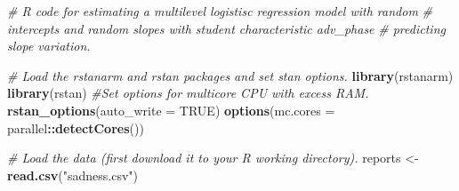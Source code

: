 \documentclass[
  english,
  doc]{apa6}
\newenvironment{Shaded}{\begin{snugshade}}{\end{snugshade}}
\newcommand{\CommentTok}[1]{\textcolor[rgb]{0.56,0.35,0.01}{\textit{#1}}}
\newcommand{\DataTypeTok}[1]{\textcolor[rgb]{0.13,0.29,0.53}{#1}}
\newcommand{\KeywordTok}[1]{\textcolor[rgb]{0.13,0.29,0.53}{\textbf{#1}}}
\newcommand{\NormalTok}[1]{#1}
\newcommand{\OperatorTok}[1]{\textcolor[rgb]{0.81,0.36,0.00}{\textbf{#1}}}
\newcommand{\OtherTok}[1]{\textcolor[rgb]{0.56,0.35,0.01}{#1}}
\newcommand{\StringTok}[1]{\textcolor[rgb]{0.31,0.60,0.02}{#1}}
\begin{document}
\begin{Shaded}
\begin{Highlighting}[]
\CommentTok{\# R code for estimating a multilevel logistisc regression model with random}
\CommentTok{\# intercepts and random slopes with student characteristic \textquotesingle{}adv\_phase\textquotesingle{}}
\CommentTok{\# predicting slope variation.}

\CommentTok{\# Load the rstanarm and rstan packages and set stan options.}
\KeywordTok{library}\NormalTok{(rstanarm)}
\KeywordTok{library}\NormalTok{(rstan)}
\CommentTok{\#Set options for multicore CPU with excess RAM.}
\KeywordTok{rstan\_options}\NormalTok{(}\DataTypeTok{auto\_write =} \OtherTok{TRUE}\NormalTok{)}
\KeywordTok{options}\NormalTok{(}\DataTypeTok{mc.cores =}\NormalTok{ parallel}\OperatorTok{::}\KeywordTok{detectCores}\NormalTok{())}

\CommentTok{\# Load the data (first download it to your R working directory).}
\NormalTok{reports \textless{}{-}}\StringTok{ }\KeywordTok{read.csv}\NormalTok{(}\StringTok{"sadness.csv"}\NormalTok{)}


\end{Highlighting}
\end{Shaded}
\end{document}

